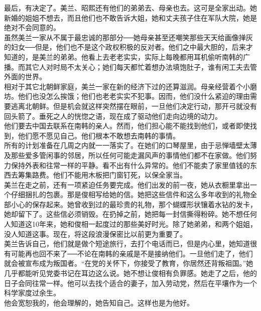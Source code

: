 最后，有决定了。美兰、昭熙还有他们的弟弟去、母亲也去。这可是全家出动。她新婚的姐姐不想去，而且他们也不敢告诉大姐，她和丈夫孩子住在军队大院，她是绝对不会同意的。\\

虽然美兰一家从不属于最忠诚的那部分──她母亲甚至还嘲笑那些天天给画像掸灰的妇女──但是，他们也不是这个政权积极的反对者。他们之中最大胆的，后来才知道的，是美兰的弟弟。他看上去老老实实，实际上每晚都用耳机偷听南韩的广播。而其它人对时局不太关心；她们每天都忙着想办法填饱肚子，谁有闲工夫去管外面的世界。\\

相对于其它北朝鲜家庭，美兰一家在新的经济下过的还算滋润。母亲经营着个小磨坊。他们也没怎么挨饿；他们也老老实实不犯事。因而，他们没什么紧迫的理由需要逃离北朝鲜。但是机会就这样突然摆在眼前，一旦他们决定行动，那开弓就没有回头箭了。垂死之人的恍惚之语，现在成了驱动他们走向边境的动力。\\

他们要去中国去联系在南韩的亲人。然而，他们担心能不能找到他们，或者即使找到，他们愿不愿见自己。他们根本不敢想去南韩的事情。\\

所有的计划准备在几周之内就一一落实了。在她们的口琴屋里，由于忌惮墙壁太薄及那些爱多管闲事的邻居，所以任何可能走漏风声的事情他们都不在家做。他们努力保持外表和往常一样的平静。看不出有什么异常的。他们不能卖了家里值钱的东西去筹集路费。他们不能用木板把门窗钉死，以保全家当。\\

美兰在走之前，还有一项紧迫任务要完成。他们出发的前一夜，她从衣橱里拿出一个仔细捆扎的包裹。那是俊相写给她的信。她把这些信件和这么多年收到的礼物全部小心的保存起来。她曾收到过的最珍贵的礼物，那个蝴蝶形状镶着水钻的发卡，她却留下了。这些信必须销毁。在扔掉之前，她把每一封信撕得粉碎。她不想任何人知道这10年来，她和俊相一起度过的那些美好时光。除了她弟弟，和两个姐姐，没人知道这事。现在，将这段浪漫保密比以前更为重要了。\\

美兰告诉自己，他们就是做个短途旅行，去打个电话而已，但是内心里，她知道很有可能再也回不来了──不论在南韩的亲戚是不是接纳他们。一旦他们走了，他们就会被宣布成为叛国者。“在党的关怀下，你接受了教育，你居然还背叛祖国。”她几乎都能听见党委书记在耳边这么说。她不想让俊相有负罪感。她走了之后，他的日子会同往常一样。他可以去找个适合的妻子，加入劳动党，然后在平壤作为一个科学家度过余生。\\

他会宽恕我的，他会理解的，她告知自己。这样也是为他好。\\

